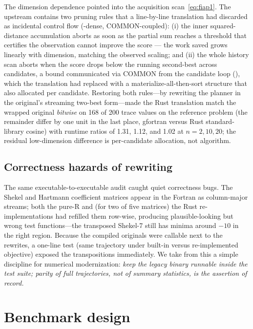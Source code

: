 The dimension dependence pointed into the acquisition
scan~\eqref{eq:fiap1}. The upstream  contains two pruning
rules that a line-by-line translation had discarded as incidental
control flow (-dense, COMMON-coupled): (i) the inner
squared-distance accumulation aborts as soon as the partial sum reaches
a threshold that certifies the observation cannot improve the score
--- the work saved grows linearly with dimension, matching the observed
scaling; and (ii) the whole history scan aborts when the score drops
below the running second-best across candidates, a bound communicated
via COMMON from the candidate loop (), which the
translation had replaced with a materialize-all-then-sort structure that
also allocated per candidate. Restoring both rules---by rewriting the
planner in the original's streaming two-best form---made the Rust
translation match the wrapped original \emph{bitwise} on 168 of 200
trace values on the reference problem (the remainder differ by one unit
in the last place, gfortran versus Rust standard-library cosine) with
runtime ratios of 1.31, 1.12, and 1.02 at $n=2,10,20$; the residual
low-dimension difference is per-candidate allocation, not algorithm.

\subsection{Correctness hazards of rewriting}

The same executable-to-executable audit caught quiet correctness bugs.
The Shekel and Hartmann coefficient matrices appear in the Fortran as
column-major  streams; both the pure-R and (for two of five
matrices) the Rust re-implementations had refilled them row-wise,
producing plausible-looking but wrong test functions---the transposed
Shekel-7 still has minima around $-10$ in the right region. Because the
compiled originals were callable next to the rewrites, a one-line test
(same trajectory under built-in versus re-implemented objective)
exposed the transpositions immediately. We take from this a simple
discipline for numerical modernization: \emph{keep the legacy binary
runnable inside the test suite; parity of full trajectories, not of
summary statistics, is the assertion of record.}

\section{Benchmark design}
\label{sec:bench}

